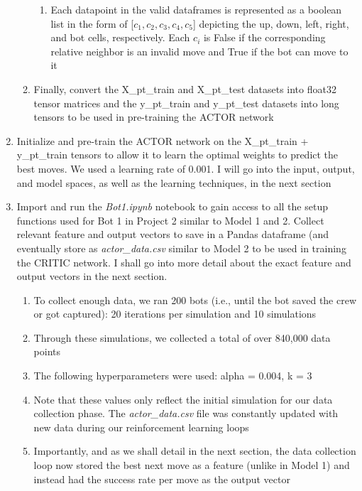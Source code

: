 \documentclass[11pt]{article}
\begin{document}
\begin{enumerate}
\begin{enumerate}
\begin{enumerate}
            \item Each datapoint in the valid dataframes is represented as a boolean list in the form of [$c_1, c_2, c_3, c_4, c_5$] depicting the up, down, left, right, and bot cells, respectively. Each $c_i$ is False if the corresponding relative neighbor is an invalid move and True if the bot can move to it
        \end{enumerate}
        \item Finally, convert the X\_pt\_train and X\_pt\_test datasets into float32 tensor matrices and the y\_pt\_train and y\_pt\_test datasets into long tensors to be used in pre-training the ACTOR network
    \end{enumerate}
    \item Initialize and pre-train the ACTOR network on the X\_pt\_train + y\_pt\_train tensors to allow it to learn the optimal weights to predict the best moves. We used a learning rate of 0.001. I will go into the input, output, and model spaces, as well as the learning techniques, in the next section
    \item Import and run the \emph{Bot1.ipynb} notebook to gain access to all the setup functions used for Bot 1 in Project 2 similar to Model 1 and 2. Collect relevant feature and output vectors to save in a Pandas dataframe (and eventually store as \emph{actor\_data.csv} similar to Model 2 to be used in training the CRITIC network. I shall go into more detail about the exact feature and output vectors in the next section.
    \begin{enumerate}
        \item To collect enough data, we ran 200 bots (i.e., until the bot saved the crew or got captured): 20 iterations per simulation and 10 simulations
        \item Through these simulations, we collected a total of over 840,000 data points
        \item The following hyperparameters were used: alpha = 0.004, k = 3
        \item Note that these values only reflect the initial simulation for our data collection phase. The \emph{actor\_data.csv} file was constantly updated with new data during our reinforcement learning loops
        \item Importantly, and as we shall detail in the next section, the data collection loop now stored the best next move as a feature (unlike in Model 1) and instead had the success rate per move as the output vector
    \end{enumerate}

\end{enumerate}
\end{document}
